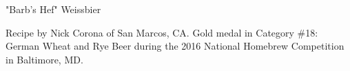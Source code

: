 \stylesection{\styleweissbier}

\begin{recipe}{"Barb's Hef" Weissbier}

\begin{aboutblock}
Recipe by Nick Corona of San Marcos, CA. Gold medal in Category \#18: German
Wheat and Rye Beer during the 2016 National Homebrew Competition in
Baltimore, MD. \sourceaha
\end{aboutblock}


\begin{methodandtiming}
 
\begin{mashsteps}
\end{mashsteps}

\begin{fermentationsteps}
\end{fermentationsteps}

\end{methodandtiming}

\recipebreak

\begin{ingredientsblock}

\begin{malts}
\end{malts}

\begin{hops}
\end{hops}


\end{ingredientsblock}

\end{recipe}

